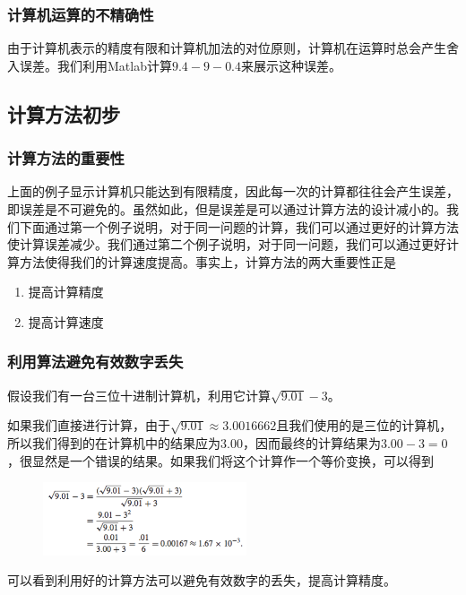 \documentclass[10pt]{beamer}
\begin{document}
\begin{frame}
\frametitle{计算机运算的不精确性}
由于计算机表示的精度有限和计算机加法的对位原则，计算机在运算时总会产生舍入误差。我们利用Matlab计算$9.4-9-0.4$来展示这种误差。


\end{frame}


\subsection{计算方法初步}
\begin{frame}
\frametitle{计算方法的重要性}
上面的例子显示计算机只能达到有限精度，因此每一次的计算都往往会产生误差，即误差是不可避免的。虽然如此，但是误差是可以通过计算方法的设计减小的。我们下面通过第一个例子说明，对于同一问题的计算，我们可以通过更好的计算方法使计算误差减少。我们通过第二个例子说明，对于同一问题，我们可以通过更好计算方法使得我们的计算速度提高。事实上，计算方法的两大重要性正是
\begin{enumerate}
\item 提高计算精度
\item 提高计算速度
\end{enumerate}

\end{frame}


\begin{frame}
\frametitle{利用算法避免有效数字丢失}
\begin{example}
假设我们有一台三位十进制计算机，利用它计算$\sqrt{9.01}-3$。
\end{example}

\begin{solution}
如果我们直接进行计算，由于$\sqrt{9.01} \approx 3.0016662$且我们使用的是三位的计算机，所以我们得到的在计算机中的结果应为$3.00$，因而最终的计算结果为$3.00-3 = 0$，很显然是一个错误的结果。如果我们将这个计算作一个等价变换，可以得到
\begin{figure}
\includegraphics[width=6cm]{figs/loss_of_significant_numbers.png} 
\end{figure}
可以看到利用好的计算方法可以避免有效数字的丢失，提高计算精度。
\end{solution}

\end{frame}
\end{document}

